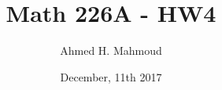 \documentclass[12pt]{article}
\begin{document}
\title{Math 226A - HW4}
\author{Ahmed H. Mahmoud}
\date{December, 11th 2017} 

\maketitle

\newcommand{\cn}{Crank-Nicolson}






\newpage

%




\end{document}
